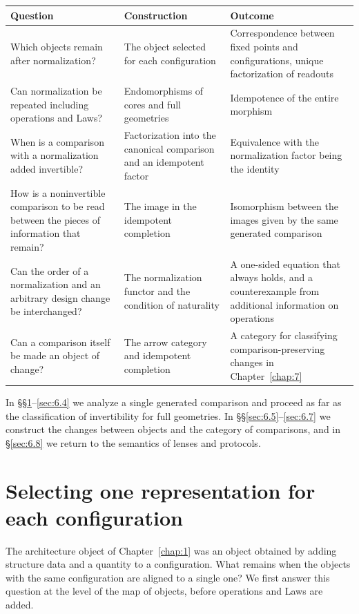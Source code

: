 \begin{xltabular}{\linewidth}{@{}LLL@{}}
\toprule
Question & Construction & Outcome \\
\midrule
\endhead
Which objects remain after normalization? & The object selected for each configuration & Correspondence between fixed points and configurations, unique factorization of readouts \\
\addlinespace[3pt]
Can normalization be repeated including operations and Laws? & Endomorphisms of cores and full geometries & Idempotence of the entire morphism \\
\addlinespace[3pt]
When is a comparison with a normalization added invertible? & Factorization into the canonical comparison and an idempotent factor & Equivalence with the normalization factor being the identity \\
\addlinespace[3pt]
How is a noninvertible comparison to be read between the pieces of information that remain? & The image in the idempotent completion & Isomorphism between the images given by the same generated comparison \\
\addlinespace[3pt]
Can the order of a normalization and an arbitrary design change be interchanged? & The normalization functor and the condition of naturality & A one-sided equation that always holds, and a counterexample from additional information on operations \\
\addlinespace[3pt]
Can a comparison itself be made an object of change? & The arrow category and idempotent completion & A category for classifying comparison-preserving changes in Chapter~\ref{chap:7} \\
\bottomrule
\end{xltabular}

In \S\S\ref{sec:6.1}--\ref{sec:6.4} we analyze a single generated comparison and proceed as
far as the classification of invertibility for full geometries.
In \S\S\ref{sec:6.5}--\ref{sec:6.7} we construct the changes between objects and the
category of comparisons, and in \S\ref{sec:6.8} we return to the semantics of lenses and
protocols.

\section{Selecting one representation for each configuration}\label{sec:6.1}

The architecture object of Chapter~\ref{chap:1} was an object obtained by adding structure
data and a quantity to a configuration.
What remains when the objects with the same configuration are aligned to a single one?
We first answer this question at the level of the map of objects, before operations and
Laws are added.

